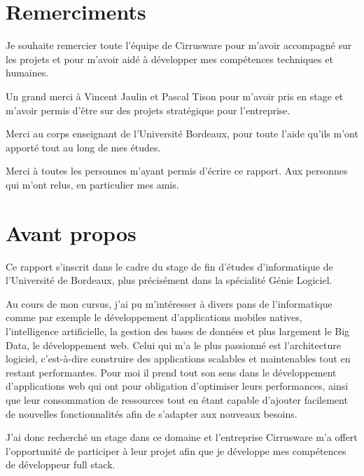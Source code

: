 \section{Remerciments}
Je souhaite remercier toute l'équipe de Cirrusware pour m'avoir accompagné sur les projets et pour m'avoir aidé à développer mes compétences techniques et humaines.

Un grand merci à Vincent Jaulin et Pascal Tison pour m'avoir pris en stage et m'avoir permis d'être sur des projets stratégique pour l'entreprise.

Merci au corps enseignant de l'Université Bordeaux, pour toute l'aide qu'ils m'ont apporté tout au long de mes études.

Merci à toutes les personnes m'ayant permis d'écrire ce rapport. Aux personnes qui m'ont relus, en particulier mes amis. 





\newpage
\section{Avant propos}
Ce rapport s'inscrit dans le cadre du stage de fin d'études d'informatique de l'Université de Bordeaux, plus précisément dans la spécialité Génie Logiciel.

Au cours de mon cursus, j'ai pu m'intéresser à divers pans de l'informatique comme par exemple le développement d'applications mobiles natives, l'intelligence artificielle, la gestion des bases de données et plus largement le Big Data, le développement web. Celui qui m'a le plus passionné est l'architecture logiciel, c'est-à-dire construire des applications scalables et maintenables tout en restant performantes. Pour moi il prend tout son sens dans le développement d'applications web qui ont pour obligation d'optimiser leurs performances, ainsi que leur consommation de ressources tout en étant capable d'ajouter facilement de nouvelles fonctionnalités afin de s'adapter aux nouveaux besoins.

J'ai donc recherché un stage dans ce domaine et l'entreprise Cirrusware m'a offert l'opportunité de participer à leur projet afin que je développe mes compétences de développeur full stack. 





